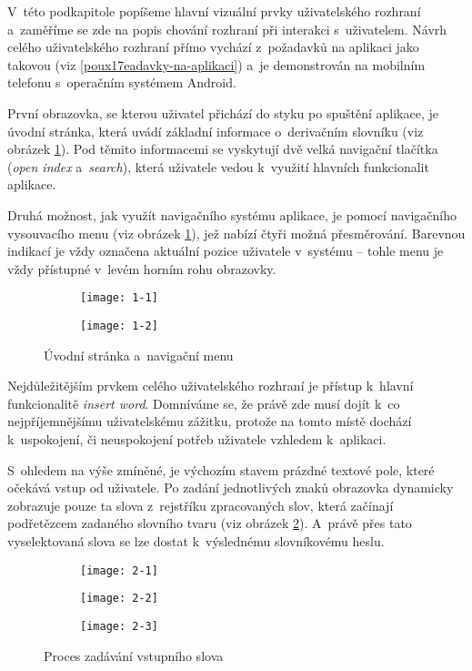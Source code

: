 V~této podkapitole popíšeme hlavní vizuální prvky uživatelského rozhraní
a~zaměříme se zde na popis chování rozhraní při interakci s~uživatelem.
Návrh celého uživatelského rozhraní přímo vychází z~požadavků na
aplikaci jako takovou (viz \ref{poux17eadavky-na-aplikaci}) a~je
demonstrován na mobilním telefonu s~operačním systémem Android.

První obrazovka, se kterou uživatel přichází do styku po spuštění
aplikace, je úvodní stránka, která uvádí základní informace o~derivačním
slovníku (viz obrázek \ref{1}). Pod těmito informacemi se vyskytují dvě
velká navigační tlačítka (\emph{open index} a~\emph{search}), která
uživatele vedou k~využití hlavních funkcionalit aplikace.

Druhá možnost, jak využít navigačního systému aplikace, je pomocí
navigačního vysouvacího menu (viz obrázek \ref{1}), jež nabízí čtyři
možná přesměrování. Barevnou indikací je vždy označena aktuální pozice
uživatele v~systému -- tohle menu je vždy přístupné v~levém horním rohu
obrazovky.

\begin{figure}[hb!]
  \begin{subfigure}[b]{0.45\textwidth}
    \texttt{[image: 1-1]}
  \end{subfigure}
  \hfill
  \begin{subfigure}[b]{0.45\textwidth}
    \texttt{[image: 1-2]}
  \end{subfigure}
  \caption{Úvodní stránka a~navigační menu}
  \label{1}
\end{figure}

Nejdůležitějším prvkem celého uživatelského rozhraní je přístup k~hlavní
funkcionalitě \emph{insert word}. Domníváme se, že právě zde musí dojít
k~co nejpříjemnějšímu uživatelskému zážitku, protože na tomto místě
dochází k~uspokojení, či neuspokojení potřeb uživatele vzhledem
k~aplikaci.

S~ohledem na výše zmíněné, je výchozím stavem prázdné textové pole,
které očekává vstup od uživatele. Po zadání jednotlivých znaků obrazovka
dynamicky zobrazuje pouze ta slova z~rejstříku zpracovaných slov, která
začínají podřetězcem zadaného slovního tvaru (viz obrázek \ref{2}).
A~právě přes tato vyselektovaná slova se lze dostat k~výslednému
slovníkovému heslu.

\begin{figure}[ht]
  \begin{subfigure}[b]{0.3\textwidth}
    \texttt{[image: 2-1]}
  \end{subfigure}
  \hfill
  \begin{subfigure}[b]{0.3\textwidth}
    \texttt{[image: 2-2]}
  \end{subfigure}
   \hfill
  \begin{subfigure}[b]{0.3\textwidth}
   \texttt{[image: 2-3]}
  \end{subfigure}
  \caption{Proces zadávání vstupního slova}
  \label{2}
\end{figure}

